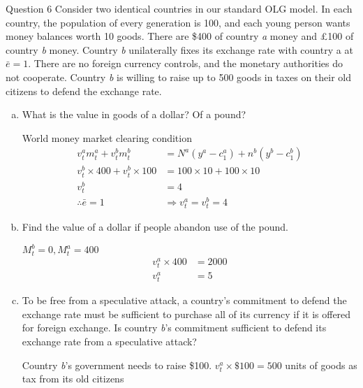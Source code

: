 \documentclass[a4paper]{article}
\newif\IfInSansMode
\numberwithin{equation}{section}
\numberwithin{figure}{section}
\begin{document}
	\begin{questionbox}{Question 6}
		Consider two identical countries in our standard OLG model. In each country, the population of every generation is 100, and each young person wants money balances worth 10 goods. There are \$400 of country \textit{a} money and \pounds 100 of country \textit{b} money. Country \textit{b} unilaterally fixes its exchange rate with country a at \(\bar{e} = 1\). There are no foreign currency controls, and the monetary authorities do not cooperate. Country \textit{b} is willing to raise up to 500 goods in taxes on their old citizens to defend the exchange rate.
		\begin{enumerate}[(a)]
			\item What is the value in goods of a dollar? Of a pound?
			\begin{explanationbox}
				World money market clearing condition
				\begin{align*}
					v_t^a m_t^a + v_t^bm_t^b &= N^a(y^a-c_1^a)+n^b(y^b-c_1^b)\\
					v^b_t \times 400 + v_t^b \times 100 &= 100\times 10 + 100 \times 10\\
					v_t^b &= 4\\
					\therefore \bar{e}=1 &\Rightarrow v_t^a=v_t^b = 4
				\end{align*}
			\end{explanationbox}
			\item Find the value of a dollar if people abandon use of the pound.
			\begin{explanationbox}
				\( M_t^b = 0, M_t^a = 400 \)
				\begin{align*}
					v_t^a \times 400 &= 2000\\
					v_t^a &= 5
				\end{align*}
			\end{explanationbox}
			\item To be free from a speculative attack, a country's commitment to defend the exchange rate must be sufficient to purchase all of its currency if it is offered for foreign exchange. Is country \textit{b}'s commitment sufficient to defend its exchange rate from a speculative attack?
			\begin{explanationbox}
				Country \textit{b}'s government needs to raise \$100. \( v_t^a \times \$100 = 500 \) units of goods as tax from its old citizens
			\end{explanationbox}
		\end{enumerate}
	\end{questionbox}
\end{document}

